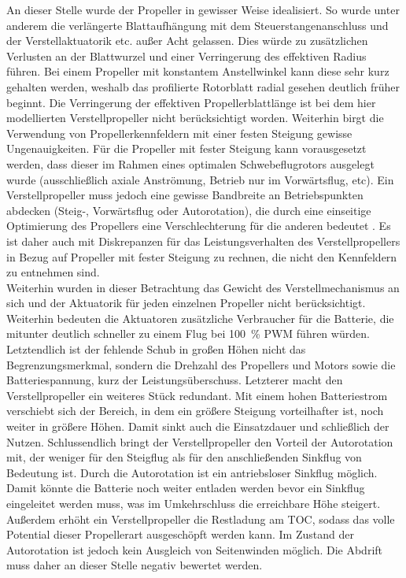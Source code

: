 An dieser Stelle wurde der Propeller in gewisser Weise idealisiert. So wurde unter anderem die verlängerte Blattaufhängung mit dem Steuerstangenanschluss und der Verstellaktuatorik etc. außer Acht gelassen. Dies würde zu zusätzlichen Verlusten an der Blattwurzel und einer Verringerung des effektiven Radius führen. Bei einem Propeller mit konstantem Anstellwinkel kann diese sehr kurz gehalten werden, weshalb das profilierte Rotorblatt radial gesehen deutlich früher beginnt. Die Verringerung der effektiven Propellerblattlänge ist bei dem hier modellierten Verstellpropeller nicht berücksichtigt worden. Weiterhin birgt die Verwendung von Propellerkennfeldern mit einer festen Steigung gewisse Ungenauigkeiten. Für die Propeller mit fester Steigung kann vorausgesetzt werden, dass dieser im Rahmen eines optimalen Schwebeflugrotors \cite[S.197-S.205]{Wall.2015} ausgelegt wurde (ausschließlich axiale Anströmung, Betrieb nur im Vorwärtsflug, etc). Ein Verstellpropeller muss jedoch eine gewisse Bandbreite an Betriebspunkten abdecken (Steig-, Vorwärtsflug oder Autorotation), die durch eine einseitige Optimierung des Propellers eine Verschlechterung für die anderen bedeutet \cite[S.203]{Wall.2015}. Es ist daher auch mit Diskrepanzen für das Leistungsverhalten des Verstellpropellers in Bezug auf Propeller mit fester Steigung zu rechnen, die nicht den Kennfeldern zu entnehmen sind. \\
Weiterhin wurden in dieser Betrachtung das Gewicht des Verstellmechanismus an sich und der Aktuatorik für jeden einzelnen Propeller nicht berücksichtigt. Weiterhin bedeuten die Aktuatoren zusätzliche Verbraucher für die Batterie, die mitunter deutlich schneller zu einem Flug bei \SI{100}{\%} PWM führen würden. Letztendlich ist der fehlende Schub in großen Höhen nicht das Begrenzungsmerkmal, sondern die Drehzahl des Propellers und Motors sowie die Batteriespannung, kurz der Leistungsüberschuss. Letzterer macht den Verstellpropeller ein weiteres Stück redundant. %
Mit einem hohen Batteriestrom verschiebt sich der Bereich, in dem ein größere Steigung vorteilhafter ist, noch weiter in größere Höhen. Damit sinkt auch die Einsatzdauer und schließlich der Nutzen. 
Schlussendlich bringt der Verstellpropeller den Vorteil der Autorotation mit, der weniger für den Steigflug als für den anschließenden Sinkflug von Bedeutung ist. Durch die Autorotation ist ein antriebsloser Sinkflug möglich. Damit könnte die Batterie noch weiter entladen werden bevor ein Sinkflug eingeleitet werden muss, was im Umkehrschluss die erreichbare Höhe steigert. Außerdem erhöht ein Verstellpropeller die Restladung am TOC, sodass das volle Potential dieser Propellerart ausgeschöpft werden kann. Im Zustand der Autorotation ist jedoch kein Ausgleich von Seitenwinden möglich. Die Abdrift muss daher an dieser Stelle negativ bewertet werden. \\

